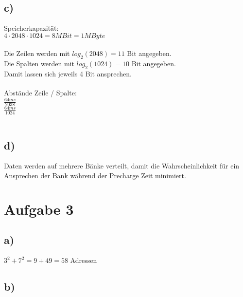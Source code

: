 \documentclass[10pt,a4paper]{article}
\begin{document}
\subsection*{c)}
Speicherkapazität:\\
$4 \cdot 2048 \cdot 1024 = 8MBit = 1MByte$\\
\\
Die Zeilen werden mit $log_2(2048) = 11$ Bit angegeben.\\
Die Spalten werden mit $log_2(1024) = 10$ Bit angegeben.\\
Damit lassen sich jeweils 4 Bit ansprechen.\\
\\
Abstände Zeile / Spalte:\\
$\frac{64ms}{2038}$\\
$\frac{64ms}{1024}$\\
\\

\subsection*{d)}
Daten werden auf mehrere Bänke verteilt, damit die Wahrscheinlichkeit für ein Ansprechen der Bank während der Precharge Zeit minimiert.


\section*{Aufgabe 3}

\subsection*{a)}
$3^2 + 7^2 = 9 + 49= 58$ Adressen\\

\subsection*{b)}
\end{document}
